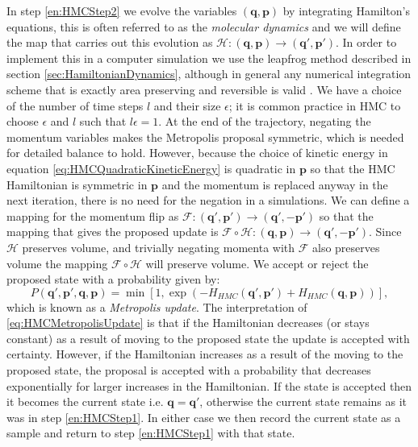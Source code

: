 \documentclass[12pt]{article}
\begin{document}
            In step \ref{en:HMCStep2} we evolve the variables $\left(\bm{q},\bm{p}\right)$ by integrating Hamilton's equations, this is often referred to as the \textit{molecular dynamics} and we will define the map that carries out this evolution as $\mathcal{H}:\left(\bm{q},\bm{p}\right)\rightarrow\left(\bm{q}',\bm{p}'\right)$. In order to implement this in a computer simulation we use the leapfrog method described in section \ref{sec:HamiltonianDynamics}, although in general any numerical integration scheme that is exactly area preserving and reversible is valid \cite{kennedy_pendleton_2001}. We have a choice of the number of time steps $l$ and their size $\epsilon$; it is common practice in HMC to choose $\epsilon$ and $l$ such that $l\epsilon=1$. At the end of the trajectory, negating the momentum variables makes the Metropolis proposal symmetric, which is needed for detailed balance to hold. However, because the choice of kinetic energy in equation \ref{eq:HMCQuadraticKineticEnergy} is quadratic in $\bm{p}$ so that the HMC Hamiltonian is symmetric in $\bm{p}$ and the momentum is replaced anyway in the next iteration, there is no need for the negation in a simulations. We can define a mapping for the momentum flip as $\mathcal{F}:\left(\bm{q}',\bm{p}'\right)\rightarrow\left(\bm{q}',-\bm{p}'\right)$ so that the mapping that gives the proposed update is $\mathcal{F}\circ \mathcal{H} : \left(\bm{q},\bm{p}\right)\rightarrow\left(\bm{q}',-\bm{p}'\right)$. Since $\mathcal{H}$ preserves volume, and trivially negating momenta with $\mathcal{F}$ also preserves volume the mapping $\mathcal{F}\circ \mathcal{H}$ will preserve volume. We accept or reject the proposed state with a probability given by:
            \begin{equation}
                \label{eq:HMCMetropolisUpdate}
                P\left(\bm{q}',\bm{p}',\bm{q},\bm{p}\right) = \min{\left[1,\exp{\left(-H_{HMC}\left(\bm{q}',\bm{p}'\right)+ \allowbreak H_{HMC}\left(\bm{q},\bm{p}\right)\right)}\right]},
            \end{equation}
            which is known as a \textit{Metropolis update}. The interpretation of \ref{eq:HMCMetropolisUpdate} is that if the Hamiltonian decreases (or stays constant) as a result of moving to the proposed state the update is accepted with certainty. However, if the Hamiltonian increases as a result of the moving to the proposed state, the proposal is accepted with a probability that decreases exponentially for larger increases in the Hamiltonian. If the state is accepted then it becomes the current state i.e. $\bm{q} = \bm{q}'$, otherwise the current state remains as it was in step \ref{en:HMCStep1}. In either case we then record the current state as a sample and return to step \ref{en:HMCStep1} with that state.
\end{document}
